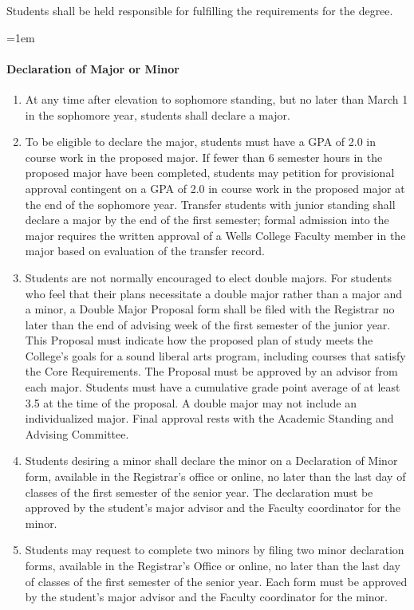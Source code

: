 \documentclass{manual}
\let\oldparagraph\paragraph
\renewcommand\paragraph{\leftskip=1em\oldparagraph}
\newcommand{\itemLevelA}{\alph*.}
\newcommand{\itemRefA}{\alph*}
\begin{document}
Students shall be held responsible for fulfilling the requirements for the degree.

\paragraph{Declaration of Major or Minor}

\begin{enumerate}[label=\itemLevelA,ref=\itemRefA]

\item At any time after elevation to sophomore standing, but no later than March 1 in the sophomore year, students shall declare a major.

\item To be eligible to declare the major, students must have a GPA of 2.0 in course work in the proposed major. If fewer than 6 semester hours in the proposed major have been completed, students may petition for provisional approval contingent on a GPA of 2.0 in course work in the proposed major at the end of the sophomore year. Transfer students with junior standing shall declare a major by the end of the first semester; formal admission into the major requires the written approval of a Wells College Faculty member in the major based on evaluation of the transfer record.

\item Students are not normally encouraged to elect double majors. For students who feel  that their plans necessitate a double major rather than a major and a minor,  a Double Major Proposal form shall be filed with the Registrar no later than the 
end of advising week of the first semester of the junior year. This Proposal must indicate how the proposed plan of study meets the College's goals for a sound liberal arts program, including courses that satisfy the Core Requirements. The Proposal must be approved by an advisor from each major. Students must have a cumulative grade point average of at least 3.5 at the time of the proposal. A double major may not include an individualized major. Final approval rests with the Academic Standing and Advising Committee.

\item Students desiring a minor shall declare the minor on a Declaration of Minor form, available in the Registrar's office or online, no later than the last day of classes of the first semester of the senior year. The declaration must be approved by the student's major advisor and the Faculty coordinator for the minor.

\item Students may request to complete two minors by filing two minor declaration forms, available in the Registrar's Office or online, no later than the last day of classes of the first semester of the senior year. Each form must be approved by the student's major advisor and the Faculty coordinator for the minor.
\end{enumerate}
\end{document}
